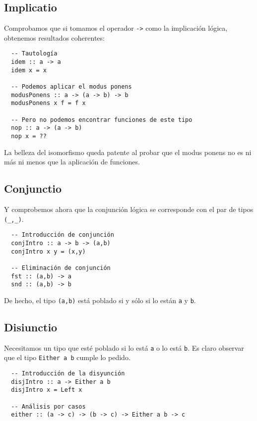 \documentclass[paper=a4, fontsize=11pt, spanish]{scrartcl} %
\numberwithin{equation}{section} %
\numberwithin{figure}{section} %
\numberwithin{table}{section} %
\begin{document}
    
    \subsection{Implicatio}
      Comprobamos que si tomamos el operador \texttt{->} como la implicación lógica, obtenemos
      resultados coherentes:
      \begin{lstlisting}
  -- Tautología
  idem :: a -> a
  idem x = x

  -- Podemos aplicar el modus ponens
  modusPonens :: a -> (a -> b) -> b 
  modusPonens x f = f x

  -- Pero no podemos encontrar funciones de este tipo
  nop :: a -> (a -> b)
  nop x = ??
      \end{lstlisting}
      La belleza del isomorfismo queda patente al probar que el modus ponens no es ni más ni 
      menos que la aplicación de funciones.
      
      
    \subsection{Conjunctio}
      Y comprobemos ahora que la conjunción lógica se corresponde con el par de tipos \texttt{(\_,\_)}.
      \begin{lstlisting}
  -- Introducción de conjunción
  conjIntro :: a -> b -> (a,b) 
  conjIntro x y = (x,y)

  -- Eliminación de conjunción
  fst :: (a,b) -> a
  snd :: (a,b) -> b
      \end{lstlisting}
      De hecho, el tipo \texttt{(a,b)} está poblado si y sólo si lo están \texttt{a} y \texttt{b}.
      
    \subsection{Disiunctio}
      Necesitamos un tipo que esté poblado si lo está \texttt{a} o lo está \texttt{b}.
      Es claro observar que el tipo \texttt{Either a b} cumple lo pedido.
      \begin{lstlisting}
  -- Introducción de la disyunción
  disjIntro :: a -> Either a b
  disjIntro x = Left x

  -- Análisis por casos
  either :: (a -> c) -> (b -> c) -> Either a b -> c 
      \end{lstlisting}
\end{document}
